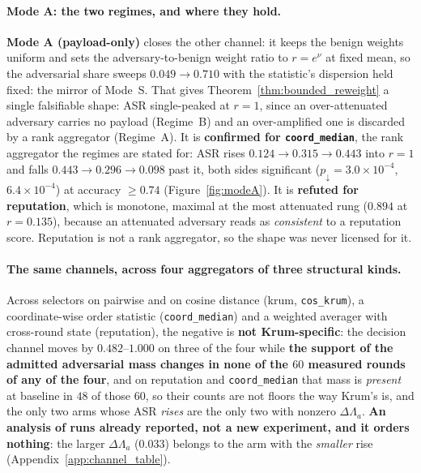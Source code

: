 \documentclass{article}
\begin{document}
\paragraph{Mode A: the two regimes, and where they hold.} \textbf{Mode A (payload-only)} closes the other channel: it keeps the benign weights uniform and sets the adversary-to-benign weight ratio to $r = e^{\nu}$ at fixed mean, so the adversarial share sweeps $0.049 \to 0.710$ with the statistic's dispersion held fixed: the mirror of Mode~S. That gives Theorem~\ref{thm:bounded_reweight} a single falsifiable shape: ASR single-peaked at $r{=}1$, since an over-attenuated adversary carries no payload (Regime~B) and an over-amplified one is discarded by a rank aggregator (Regime~A). It is \textbf{confirmed for \texttt{coord\_median}}, the rank aggregator the regimes are stated for: ASR rises $0.124 \to 0.315 \to 0.443$ into $r{=}1$ and falls $0.443 \to 0.296 \to 0.098$ past it, both sides significant ($p_{\downarrow}{=}3.0{\times}10^{-4}$, $6.4{\times}10^{-4}$) at accuracy $\ge 0.74$ (Figure~\ref{fig:modeA}). It is \textbf{refuted for reputation}, which is monotone, maximal at the most attenuated rung ($0.894$ at $r{=}0.135$), because an attenuated adversary reads as \emph{consistent} to a reputation score. Reputation is not a rank aggregator, so the shape was never licensed for it.

\paragraph{The same channels, across four aggregators of three structural kinds.} Across selectors on pairwise and on cosine distance (krum, \texttt{cos\_krum}), a coordinate-wise order statistic (\texttt{coord\_median}) and a weighted averager with cross-round state (reputation), the negative is \textbf{not Krum-specific}: the decision channel moves by $0.482$--$1.000$ on three of the four while \textbf{the support of the admitted adversarial mass changes in none of the $60$ measured rounds of any of the four}, and on reputation and \texttt{coord\_median} that mass is \emph{present} at baseline in $48$ of those $60$, so their counts are not floors the way Krum's is, and the only two arms whose ASR \emph{rises} are the only two with nonzero $\Delta\Lambda_a$. \textbf{An analysis of runs already reported, not a new experiment, and it orders nothing}: the larger $\Delta\Lambda_a$ ($0.033$) belongs to the arm with the \emph{smaller} rise (Appendix~\ref{app:channel_table}).
\end{document}
